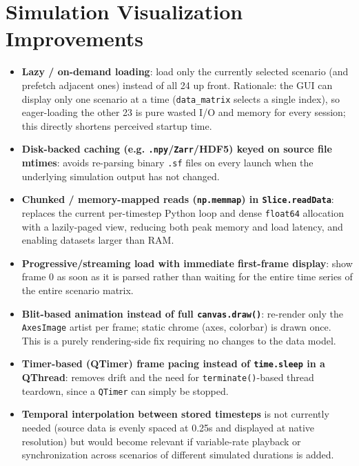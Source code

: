 \documentclass[11pt,a4paper]{report}
\begin{document}
\chapter{Simulation Visualization Improvements}

\begin{itemize}
\item \textbf{Lazy / on-demand loading}: load only the currently selected scenario (and prefetch
adjacent ones) instead of all 24 up front. Rationale: the GUI can display only one scenario at a time
(\texttt{data\_matrix} selects a single index), so eager-loading the other 23 is pure wasted I/O and
memory for every session; this directly shortens perceived startup time.
\item \textbf{Disk-backed caching (e.g. \texttt{.npy}/\texttt{Zarr}/HDF5) keyed on source file
mtimes}: avoids re-parsing binary \texttt{.sf} files on every launch when the underlying simulation
output has not changed.
\item \textbf{Chunked / memory-mapped reads (\texttt{np.memmap}) in \texttt{Slice.readData}}: replaces
the current per-timestep Python loop and dense \texttt{float64} allocation with a lazily-paged view,
reducing both peak memory and load latency, and enabling datasets larger than RAM.
\item \textbf{Progressive/streaming load with immediate first-frame display}: show frame 0 as soon as
it is parsed rather than waiting for the entire time series of the entire scenario matrix.
\item \textbf{Blit-based animation instead of full \texttt{canvas.draw()}}: re-render only the
\texttt{AxesImage} artist per frame; static chrome (axes, colorbar) is drawn once. This is a purely
rendering-side fix requiring no changes to the data model.
\item \textbf{Timer-based (QTimer) frame pacing instead of \texttt{time.sleep} in a QThread}: removes
drift and the need for \texttt{terminate()}-based thread teardown, since a \texttt{QTimer} can simply
be stopped.
\item \textbf{Temporal interpolation between stored timesteps} is not currently needed (source data is
evenly spaced at 0.25s and displayed at native resolution) but would become relevant if variable-rate
playback or synchronization across scenarios of different simulated durations is added.
\end{itemize}
\end{document}
